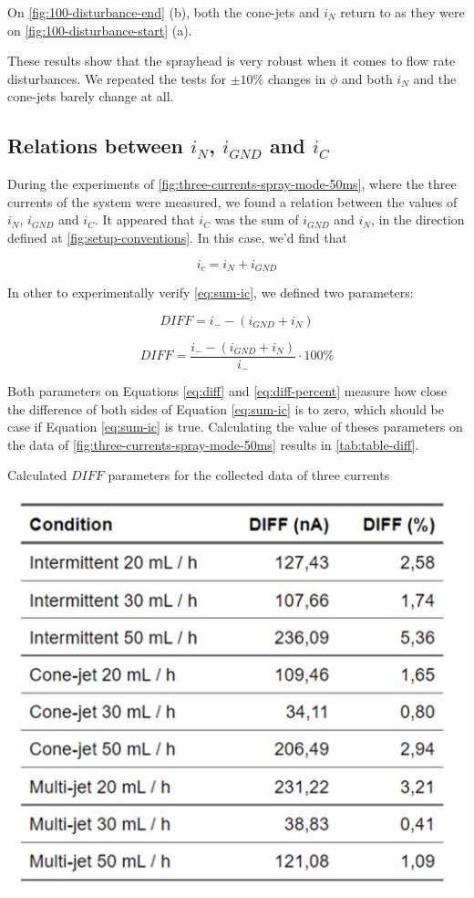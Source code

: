 \documentclass[oneside,12pt]{article}
\begin{document}
On \autoref{fig:100-disturbance-end} (b), both the cone-jets and $i_N$ return to as they were on \autoref{fig:100-disturbance-start} (a).

These results show that the sprayhead is very robust when it comes to flow rate disturbances. We repeated the tests for $\pm 10 \%$ changes
in $\phi$ and both $i_N$ and the cone-jets barely change at all.

\subsection{Relations between $i_N$, $i_{GND}$ and $i_C$}

During the experiments of \autoref{fig:three-currents-spray-mode-50ms}, where the three currents of the system
were measured, we found a relation between the values of
$i_N$, $i_{GND}$ and $i_C$. It appeared that $i_C$ was the sum of $i_{GND}$ and $i_N$, in the direction defined at
\autoref{fig:setup-conventions}. In this case, we'd find that

\begin{equation} \label{eq:sum-ic}
    i_c = i_N + i_{GND}
\end{equation}

In other to experimentally verify \autoref{eq:sum-ic}, we defined two parameters:

\begin{equation} \label{eq:diff}
    DIFF = i_- - \left(i_{GND} + i_N\right)
\end{equation}

\begin{equation} \label{eq:diff-percent}
    DIFF = \frac{i_- - \left(i_{GND} + i_N\right)}{i_-} \cdot 100\%
\end{equation}

Both parameters on Equations \ref{eq:diff} and \ref{eq:diff-percent} measure how close the difference of both
sides of Equation \ref{eq:sum-ic} is to zero,
which should be case if Equation \ref{eq:sum-ic} is true. Calculating the value of theses parameters on the data of \autoref{fig:three-currents-spray-mode-50ms}
results in \autoref{tab:table-diff}.

\begin{table}[h!]
    \begin{center}
        \caption{Calculated $DIFF$ parameters for the collected data of three currents}
        \includegraphics[width=.6\textwidth,trim=1 1 1 1,clip]{figures/table-diff.png}
        \label{tab:table-diff}
    \end{center}
  \end{table}
\end{document}
